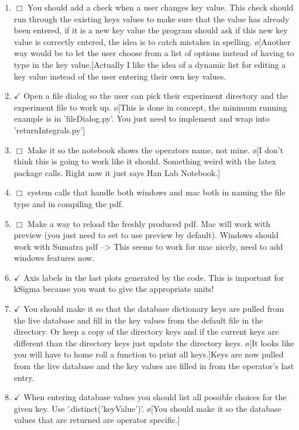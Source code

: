 \documentclass[10pt]{book}
\begin{document}
\begin{enumerate}
    \item $\Box$ You should add a check when a user changes key value. This check should run through the existing keys values to make sure that the value has already been entered, if it is a new key value the program should ask if this new key value is correctly entered, the idea is to catch mistakes in spelling. \o[Another way would be to let the user choose from a list of options instead of having to type in the key value.]{Actually I like the idea of a dynamic list for editing a key value instead of the user entering their own key values.}
    \item $\checkmark$ Open a file dialog so the user can pick their experiment directory and the experiment file to work up. \o[This is done in concept, the minimum running example is in 'fileDialog.py'. You just need to implement and wrap into 'returnIntegrals.py']{}
    \item $\Box$ Make it so the notebook shows the operators name, not mine. \o[I don't think this is going to work like it should. Something weird with the latex package calls. Right now it just says Han Lab Notebook.]{}
    \item $\Box$ system calls that handle both windows and mac both in naming the file type and in compiling the pdf.
    \item $\Box$ Make a way to reload the freshly produced pdf. Mac will work with preview (you just need to set to use preview by default). Windows should work with Sumatra pdf --> This seems to work for mac nicely, need to add windows features now.
    \item $\checkmark$ Axis labels in the last plots generated by the code. This is important for kSigma because you want to give the appropriate units!
    \item $\checkmark$ You should make it so that the database dictionary keys are pulled from the live database and fill in the key values from the default file in the directory. Or keep a copy of the directory keys and if the current keys are different than the directory keys just update the directory keys. \o[It looks like you will have to home roll a function to print all keys.]{Keys are now pulled from the live database and the key values are filled in from the operator's last entry.}
    \item $\checkmark$ When entering database values you should list all possible choices for the given key. Use '.distinct('keyValue')'. \o[You should make it so the database values that are returned are operator specific.]{}

\end{enumerate}
\end{document}
